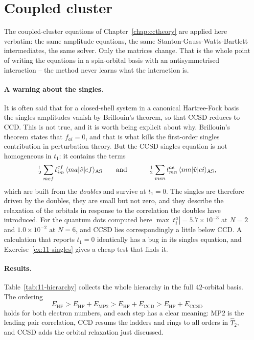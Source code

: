 \section{Coupled cluster}
\label{sec:qdcc}

The coupled-cluster equations of Chapter~\ref{chap:cctheory} are applied here
verbatim: the same amplitude equations, the same
Stanton-Gauss-Watts-Bartlett intermediates, the same solver.  Only the
matrices change.  That is the whole point of writing the equations in a
spin-orbital basis with an antisymmetrised interaction -- the method never
learns what the interaction is.

\paragraph{A warning about the singles.}
It is often said that for a closed-shell system in a canonical Hartree-Fock
basis the singles amplitudes vanish by Brillouin's theorem, so that CCSD
reduces to CCD.  This is not true, and it is worth being explicit about why.
Brillouin's theorem states that $f_{ai}=0$, and that is what kills the
first-order singles contribution in perturbation theory.  But the CCSD singles
equation is not homogeneous in $t_1$: it contains the terms
\begin{equation}
  \tfrac12\sum_{mef}t_{im}^{ef}\,\langle ma | \hat{v} | ef \rangle_{\mathrm{AS}}
  \qquad\text{and}\qquad
  -\tfrac12\sum_{men}t_{mn}^{ae}\,\langle nm | \hat{v} | ei \rangle_{\mathrm{AS}},
  \label{eq:11-singlesdriver}
\end{equation}
which are built from the \emph{doubles} and survive at $t_1=0$.  The singles
are therefore driven by the doubles, they are small but not zero, and they
describe the relaxation of the orbitals in response to the correlation the
doubles have introduced.  For the quantum dots computed here
$\max|t_i^a| = 5.7\times10^{-3}$ at $N=2$ and $1.0\times10^{-2}$ at $N=6$, and
CCSD lies correspondingly a little below CCD.  A calculation that reports
$t_1=0$ identically has a bug in its singles equation, and
Exercise~\ref{ex:11-singles} gives a cheap test that finds it.

\paragraph{Results.}
Table~\ref{tab:11-hierarchy} collects the whole hierarchy in the full
$42$-orbital basis.  The ordering
\begin{equation}
  E_{\mathrm{HF}} > E_{\mathrm{HF}}+E_{\mathrm{MP2}}
   > E_{\mathrm{HF}}+E_{\mathrm{CCD}} > E_{\mathrm{HF}}+E_{\mathrm{CCSD}}
  \label{eq:11-ordering}
\end{equation}
holds for both electron numbers, and each step has a clear meaning: MP2 is the
leading pair correlation, CCD resums the ladders and rings to all orders in
$\hat{T}_2$, and CCSD adds the orbital relaxation just discussed.

